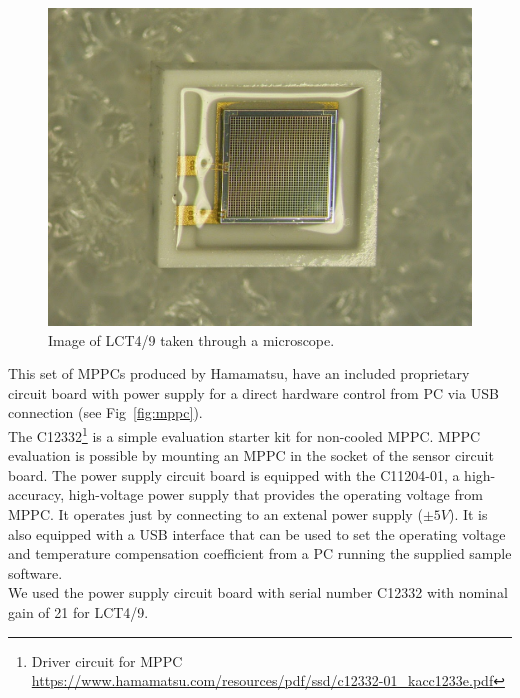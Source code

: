 \documentclass[10pt,a4paper, openany]{book}
\begin{document}
\newpage

\begin{figure}[!h]
\begin{center}
\includegraphics[scale=0.20]{imm/lct4_1.jpg}
\end{center}
\caption{Image of LCT4/9 taken through a microscope.}
\label{fig:lct4_1}
\end{figure}

This set of MPPCs produced by Hamamatsu, have an included proprietary circuit board with power supply for a direct hardware control from PC via USB connection (see Fig~\ref{fig:mppc}).\\
The C12332\footnote{Driver circuit for MPPC \url{https://www.hamamatsu.com/resources/pdf/ssd/c12332-01_kacc1233e.pdf}} is a simple evaluation starter kit for non-cooled MPPC. MPPC evaluation is possible by mounting an MPPC in the socket of the sensor circuit board. The power supply circuit board is equipped with the C11204-01, a high-accuracy, high-voltage power supply that provides the operating voltage from MPPC. It operates just by connecting to an extenal power supply ($\pm 5V$). It is also equipped with a USB interface that can be used to set the operating voltage and temperature compensation coefficient from a PC running the supplied sample software.\\
We used the power supply circuit board with serial number C12332 with nominal gain of 21 for LCT4/9.\\
\end{document}
